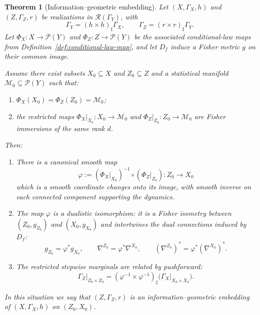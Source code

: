 \documentclass[11pt]{article}
\newtheorem{theorem}{Theorem}
\newcommand{\Rcal}{\mathcal{R}}
\newcommand{\Pcal}{\mathcal{P}}
\newcommand{\Mcal}{\mathcal{M}}
\begin{document}
\begin{theorem}[Information--geometric embedding]
\label{thm:ig-embedding}
Let $(X,\Gamma_X,h)$ and $(Z,\Gamma_Z,r)$ be realizations in
$\Rcal(\Gamma_Y)$, with
\[
  \Gamma_Y = (h\times h)_\sharp \Gamma_X,
  \qquad
  \Gamma_Z = (r\times r)_\sharp \Gamma_Y.
\]
Let $\Phi_X:X\to\Pcal(Y)$ and $\Phi_Z:Z\to\Pcal(Y)$ be the associated
conditional-law maps from Definition~\ref{def:conditional-law-map}, and
let $D_f$ induce a Fisher metric $g$ on their common image.

Assume there exist subsets $X_0\subseteq X$ and $Z_0\subseteq Z$ and a
statistical manifold $\Mcal_0\subseteq \Pcal(Y)$ such that:
\begin{enumerate}[label=(E\arabic*),leftmargin=1.8em]
  \item $\Phi_X(X_0) = \Phi_Z(Z_0) = \Mcal_0$;
  \item the restricted maps
  $\Phi_X|_{X_0}:X_0\to \Mcal_0$ and
  $\Phi_Z|_{Z_0}:Z_0\to \Mcal_0$ are Fisher immersions of the same rank
  $d$.
\end{enumerate}
Then:
\begin{enumerate}[label=(\alph*),leftmargin=1.8em]
  \item There is a canonical smooth map
  \[
    \varphi
    := (\Phi_X|_{X_0})^{-1}\circ (\Phi_Z|_{Z_0})
    : Z_0 \to X_0
  \]
  which is a smooth coordinate changes onto its image, with smooth inverse on each
  connected component supporting the dynamics.
  \item The map $\varphi$ is a dualistic isomorphism: it is a Fisher
  isometry between $(Z_0,g_{Z_0})$ and $(X_0,g_{X_0})$ and intertwines the
  dual connections induced by $D_f$:
  \[
    g_{Z_0} = \varphi^\ast g_{X_0},
    \qquad
    \nabla^{Z_0} = \varphi^\ast \nabla^{X_0},
    \qquad
    (\nabla^{Z_0})^\ast = \varphi^\ast (\nabla^{X_0})^\ast.
  \]
  \item The restricted stepwise marginals are related by pushforward:
  \[
    \Gamma_Z\big|_{Z_0\times Z_0}
    = (\varphi^{-1}\times \varphi^{-1})_\sharp
      \bigl(\Gamma_X\big|_{X_0\times X_0}\bigr).
  \]
\end{enumerate}
In this situation we say that $(Z,\Gamma_Z,r)$ is an
\emph{information--geometric embedding} of $(X,\Gamma_X,h)$ on
$(Z_0,X_0)$.
\end{theorem}
\end{document}
